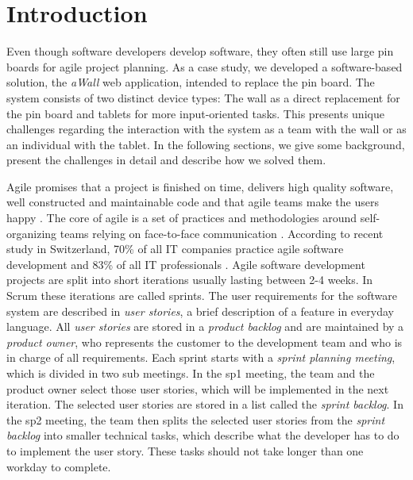 \documentclass{sigchi}
\begin{document}



\section{Introduction}
Even though software developers develop software, they often still use large pin boards for agile project planning.
As a case study, we developed a software-based solution, the \textit{aWall} web application, intended to replace the pin board.
The system consists of two distinct device types: The wall as a direct replacement for the pin board and tablets for more input-oriented tasks.
This presents unique challenges regarding the interaction with the system as a team with the wall or as an individual with the tablet.
In the following sections, we give some background, present the challenges in detail and describe how we solved them.

Agile promises that a project is finished on time, delivers high quality software, well constructed and maintainable code and that agile teams make the users happy \cite{Stellman:2014}.
The core of agile is a set of practices and methodologies around self-organizing teams relying on face-to-face communication \cite{Cockburn:2001}.
According to recent study in Switzerland, 70\% of all IT companies practice agile software development and 83\% of all IT professionals \cite{Kropp:2015}.
Agile software development projects are split into short iterations usually lasting between 2-4 weeks. In Scrum these iterations are called sprints.
The user requirements for the software system are described in \textit{user stories}, a brief description of a feature in everyday language.
All \textit{user stories} are stored in a \textit{product backlog} and are maintained by a \textit{product owner}, who represents the customer to the development team and who is in charge of all requirements.
Each sprint starts with a \textit{sprint planning meeting}, which is divided in two sub meetings. In the \gls{sp1} meeting, the team and the product owner select those user stories, which will be implemented in the next iteration.
The selected user stories are stored in a list called the \textit{sprint backlog}.
In the \gls{sp2} meeting, the team then splits the selected user stories from the \textit{sprint backlog} into smaller technical tasks, which describe what the developer has to do to implement the user story. These tasks should not take longer than one workday to complete.
\end{document}
